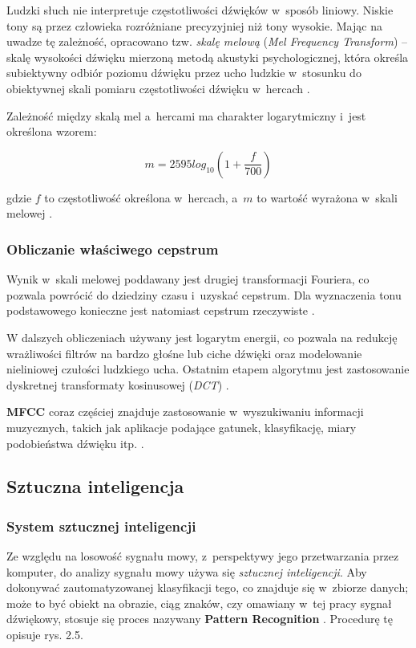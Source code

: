 Ludzki słuch nie interpretuje częstotliwości dźwięków w~sposób liniowy. Niskie tony są przez człowieka rozróżniane precyzyjniej niż tony wysokie. Mając na uwadze tę zależność, opracowano tzw. \textit{skalę melową} (\textit{Mel Frequency Transform}) – skalę wysokości dźwięku mierzoną metodą akustyki psychologicznej, która określa subiektywny odbiór poziomu dźwięku przez ucho ludzkie w~stosunku do obiektywnej skali pomiaru częstotliwości dźwięku w~hercach \cite{Wiki:MEL}.

Zależność między skalą mel a~hercami ma charakter logarytmiczny i~jest określona wzorem:

$$ m=2595 log_{10}(1 + \frac{f}{700}) $$

gdzie $f$ to częstotliwość określona w~hercach, a~$m$ to wartość wyrażona w~skali melowej \cite{Wiki:MEL}.

\subsubsection{Obliczanie właściwego cepstrum}

Wynik w~skali melowej poddawany jest drugiej transformacji Fouriera, co pozwala powrócić do dziedziny czasu i~uzyskać cepstrum. Dla wyznaczenia tonu podstawowego konieczne jest natomiast cepstrum rzeczywiste \cite{APD:PW}.

W dalszych obliczeniach używany jest logarytm energii, co pozwala na redukcję wrażliwości filtrów na bardzo głośne lub ciche dźwięki oraz modelowanie nieliniowej czułości ludzkiego ucha. Ostatnim etapem algorytmu jest zastosowanie dyskretnej transformaty kosinusowej (\textit{DCT}) \cite{Wiki:DCT} \cite{APD:PW}.

\textbf{MFCC} coraz częściej znajduje zastosowanie w~wyszukiwaniu informacji muzycznych, takich jak aplikacje podające gatunek, klasyfikację, miary podobieństwa dźwięku itp. \cite{Wiki:MFCC}.

\subsection{Sztuczna inteligencja}

\subsubsection{System sztucznej inteligencji}

Ze względu na losowość sygnału mowy, z~perspektywy jego przetwarzania przez komputer, do analizy sygnału mowy używa się \textit{sztucznej inteligencji}. Aby dokonywać zautomatyzowanej klasyfikacji tego, co znajduje się w~zbiorze danych; może to być obiekt na obrazie, ciąg znaków, czy omawiany w~tej pracy sygnał dźwiękowy, stosuje się proces nazywany \textbf{Pattern Recognition} \cite{Build:pattern}.
Procedurę tę opisuje rys. 2.5.

